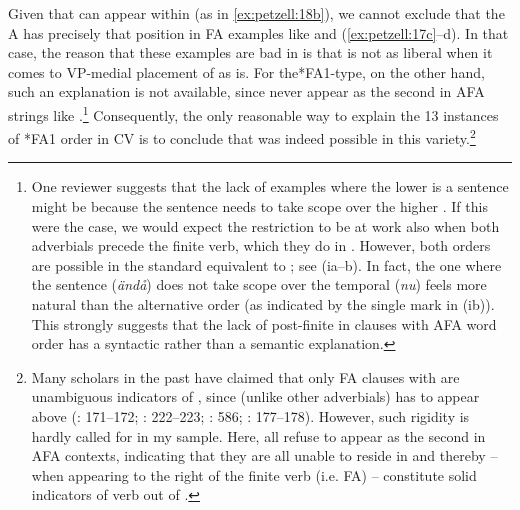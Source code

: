 \documentclass[output=paper,colorlinks,citecolor=brown,draft,draftmode]{langscibook}
\begin{document}
Given that  can appear within  (as in \ref{ex:petzell:18b}), we cannot exclude that the A has precisely that position in FA examples like  and (\ref{ex:petzell:17c}–d). In that case, the reason that these examples are bad in  is that  is not as liberal when it comes to VP-medial placement of  as  is. For the*FA1-type, on the other hand, such an explanation is not available, since  never appear as the second  in AFA strings like .\footnote{One
    reviewer suggests that the lack of examples where the lower  is a sentence  might be because the sentence  needs to take scope over the higher . If this were the case, we would expect the restriction to be at work also when both adverbials precede the finite verb, which they do in . However, both orders are possible in the standard equivalent to ; see (ia–b). In fact, the one where the sentence  (\textit{ändå}) does not take scope over the temporal (\textit{nu})  feels more natural than the alternative order (as indicated by the single  mark in (ib)). This strongly suggests that the lack of post-finite  in clauses with AFA word order has a syntactic rather than a semantic explanation.
    \ea
    \z
    \z
}
Consequently, the only reasonable way to explain the 13 instances of *FA1 order in CV is to conclude that  was indeed possible in this variety.\footnote{Many scholars in the past have claimed that only FA clauses with  are unambiguous indicators of  , since  (unlike other adverbials) has to appear above  (\citealt{Falk1993}: 171–172; \citealt{WiklundEtAl2007}: 222–223; \citealt{KoenemanZeijlstra2014}: 586; \citealt{HeycockSundquist2017}: 177–178). However, such rigidity is hardly called for in my  sample. Here, all  refuse to appear as the second  in AFA contexts, indicating that they are all unable to reside in  and thereby – when appearing to the right of the finite verb (i.e. FA) – constitute solid indicators of verb  out of .}
\end{document}
